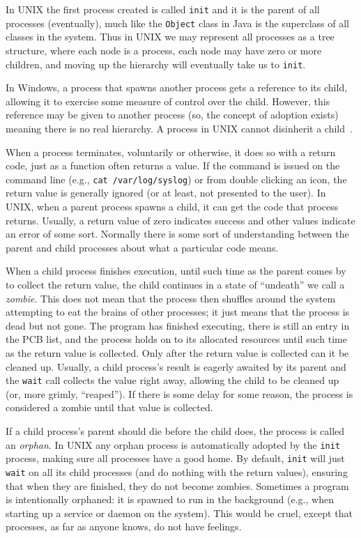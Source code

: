 In UNIX the first process created is called \texttt{init} and it is the parent of all processes (eventually), much like the \texttt{Object} class in Java is the superclass of all classes in the system. Thus in UNIX we may represent all processes as a tree structure, where each node is a process, each node may have zero or more children, and moving up the hierarchy will eventually take us to \texttt{init}.

In Windows, a process that spawns another process gets a reference to its child, allowing it to exercise some measure of control over the child. However, this reference may be given to another process (so, the concept of adoption exists) meaning there is no real hierarchy. A process in UNIX cannot disinherit a child~\cite{mos}.

When a process terminates, voluntarily or otherwise, it does so with a return code, just as a function often returns a value. If the command is issued on the command line (e.g., \texttt{cat /var/log/syslog}) or from double clicking an icon, the return value is generally ignored (or at least, not presented to the user). In UNIX, when a parent process spawns a child, it can get the code that process returns. Usually, a return value of zero indicates success and other values indicate an error of some sort. Normally there is some sort of understanding between the parent and child processes about what a particular code means.

When a child process finishes execution, until such time as the parent comes by to collect the return value, the child continues in a state of ``undeath'' we call a \textit{zombie}. This does not mean that the process then shuffles around the system attempting to eat the brains of other processes; it just means that the process is dead but not gone. The program has finished executing, there is still an entry in the PCB list, and the process holds on to its allocated resources until such time as the return value is collected. Only after the return value is collected can it be cleaned up. Usually, a child process's result is eagerly awaited by its parent and the \texttt{wait} call collects the value right away, allowing the child to be cleaned up (or, more grimly, ``reaped''). If there is some delay for some reason, the process is considered a zombie until that value is collected.

If a child process's parent should die before the child does, the process is called an \textit{orphan}. In UNIX any orphan process is automatically adopted by the \texttt{init} process, making sure all processes have a good home. By default, \texttt{init} will just \texttt{wait} on all its child processes (and do nothing with the return values), ensuring that when they are finished, they do not become zombies. Sometimes a program is intentionally orphaned: it is spawned to run in the background (e.g., when starting up a service or daemon on the system). This would be cruel, except that processes, as far as anyone knows, do not have feelings.

